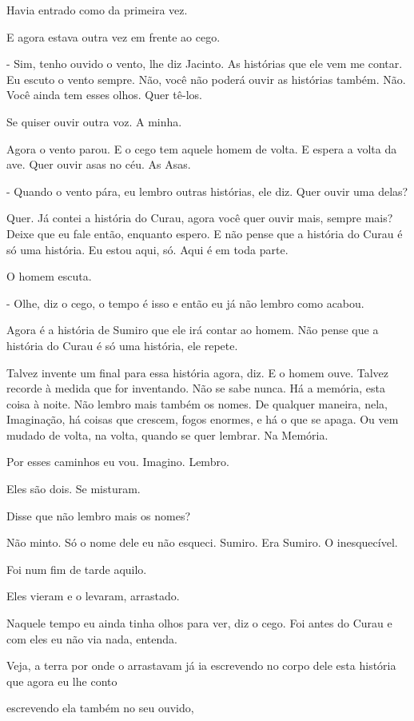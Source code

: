 Havia entrado como da primeira vez.

E agora estava outra vez em frente ao cego.

- Sim, tenho ouvido o vento, lhe diz Jacinto. As histórias que ele vem
me contar. Eu escuto o vento sempre. Não, você não poderá ouvir as
histórias também. Não. Você ainda tem esses olhos. Quer tê-los.

Se quiser ouvir outra voz. A minha.

Agora o vento parou. E o cego tem aquele homem de volta. E espera a
volta da ave. Quer ouvir asas no céu. As Asas.

- Quando o vento pára, eu lembro outras histórias, ele diz. Quer ouvir
uma delas?

Quer. Já contei a história do Curau, agora você quer ouvir mais, sempre
mais? Deixe que eu fale então, enquanto espero. E não pense que a
história do Curau é só uma história. Eu estou aqui, só. Aqui é em toda
parte.

O homem escuta.

- Olhe, diz o cego, o tempo é isso e então eu já não lembro como acabou.

Agora é a história de Sumiro que ele irá contar ao homem. Não pense que
a história do Curau é só uma história, ele repete.

Talvez invente um final para essa história agora, diz. E o homem ouve.
Talvez recorde à medida que for inventando. Não se sabe nunca. Há a
memória, esta coisa à noite. Não lembro mais também os nomes. De
qualquer maneira, nela, Imaginação, há coisas que crescem, fogos
enormes, e há o que se apaga. Ou vem mudado de volta, na volta, quando
se quer lembrar. Na Memória.

Por esses caminhos eu vou. Imagino. Lembro.

Eles são dois. Se misturam.

Disse que não lembro mais os nomes?

Não minto. Só o nome dele eu não esqueci. Sumiro. Era Sumiro. O
inesquecível.

Foi num fim de tarde aquilo.

Eles vieram e o levaram, arrastado.

Naquele tempo eu ainda tinha olhos para ver, diz o cego. Foi antes do
Curau e com eles eu não via nada, entenda.

Veja, a terra por onde o arrastavam já ia escrevendo no corpo dele esta
história que agora eu lhe conto

escrevendo ela também no seu ouvido,

